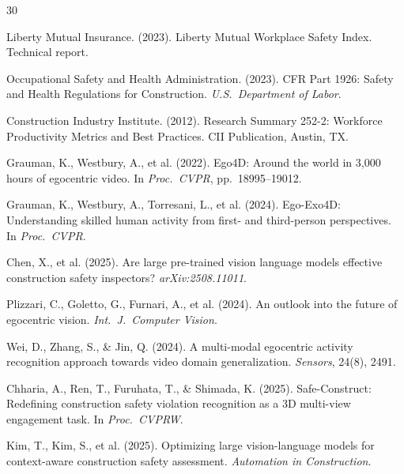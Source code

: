 \documentclass[sigconf,nonacm]{acmart}
\begin{document}

\begin{thebibliography}{30}

{Liberty Mutual Insurance}. (2023).
 Liberty Mutual Workplace Safety Index.
\newblock Technical report.

{Occupational Safety and Health Administration}. (2023).
 CFR Part 1926: Safety and Health Regulations for Construction.
\newblock \textit{U.S.\ Department of Labor}.

{Construction Industry Institute}. (2012).
\newblock Research Summary 252-2: Workforce Productivity Metrics and Best Practices.
\newblock CII Publication, Austin, TX.

Grauman, K., Westbury, A., et al. (2022).
\newblock Ego4D: Around the world in 3,000 hours of egocentric video.
\newblock In \textit{Proc.\ CVPR}, pp.~18995--19012.

Grauman, K., Westbury, A., Torresani, L., et al. (2024).
\newblock Ego-Exo4D: Understanding skilled human activity from first- and third-person perspectives.
\newblock In \textit{Proc.\ CVPR}.

Chen, X., et al. (2025).
\newblock Are large pre-trained vision language models effective construction safety inspectors?
\newblock \textit{arXiv:2508.11011}.

Plizzari, C., Goletto, G., Furnari, A., et al. (2024).
\newblock An outlook into the future of egocentric vision.
\newblock \textit{Int.\ J.\ Computer Vision}.

Wei, D., Zhang, S., \& Jin, Q. (2024).
\newblock A multi-modal egocentric activity recognition approach towards video domain generalization.
\newblock \textit{Sensors}, 24(8), 2491.

Chharia, A., Ren, T., Furuhata, T., \& Shimada, K. (2025).
\newblock Safe-Construct: Redefining construction safety violation recognition as a 3D multi-view engagement task.
\newblock In \textit{Proc.\ CVPRW}.

Kim, T., Kim, S., et al. (2025).
\newblock Optimizing large vision-language models for context-aware construction safety assessment.
\newblock \textit{Automation in Construction}.


\end{thebibliography}
\end{document}
